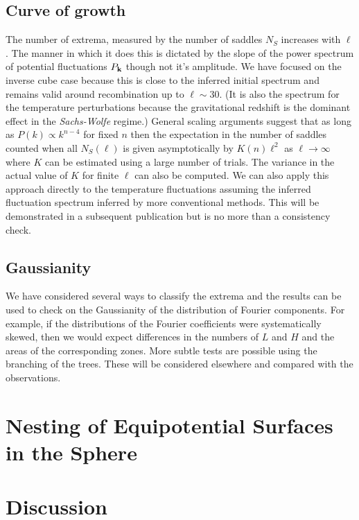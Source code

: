 \documentclass[useAMS,usenatbib,a4paper]{mn2e}
\begin{document}
\subsection{Curve of growth}
The number of extrema, measured by the number of saddles $N_S$ increases with $\ell$. The manner in which it does this is dictated by the slope of the power spectrum of potential fluctuations $P_{\bf k}$ though not it's amplitude. We have focused on the inverse cube case because this is close to the inferred initial spectrum and remains valid around recombination up to $\ell\sim30$. (It is also the spectrum for the temperature perturbations because the gravitational redshift is the dominant effect in the \emph{Sachs-Wolfe} regime.) General scaling arguments suggest that as long as $P(k)\propto k^{n-4}$ for fixed $n$ then the expectation in the number of saddles counted when all $N_S(\ell)$ is given asymptotically by $K(n)\ell^2$ as $\ell\rightarrow\infty$ where $K$ can be estimated using a large number of  trials. The variance in the actual value of $K$ for finite $\ell$ can also be computed. We can also apply this approach directly to the temperature fluctuations assuming the inferred fluctuation spectrum inferred by more conventional methods. This will be demonstrated in a subsequent publication but is no more than a consistency check.

\subsection{Gaussianity}
We have considered several ways to classify the extrema and the results can be used to check on the Gaussianity of the distribution of Fourier components. For example, if the distributions of the Fourier coefficients were systematically skewed, then we would expect differences in the numbers of $L$ and $H$ and the areas of the corresponding zones. More subtle tests are possible using the branching of the trees. These will be considered elsewhere and compared with the observations.



\section{Nesting of Equipotential Surfaces in the Sphere}


\section{Discussion}





\end{document}
